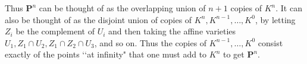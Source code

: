 \documentclass[10pt]{article}
\begin{document}
Thus $\mathbf P^n$ can be thought of as the overlapping union of $n+1$
copies of $K^n$. It can also be thought of as the disjoint union of
copies of $K^n,K^{n-1},\ldots,K^0$, by letting $Z_i$ be the complement
of $U_i$ and then taking the affine varieties $U_1,Z_1\cap U_2, Z_1\cap
Z_2\cap U_3$, and so on. Thus the copies of $K^{n-1},\ldots,K^0$ consist
exactly of the points \lq\lq at infinity" that one must add to $K^n$ to
get $\mathbf P^n$.
\end{document}
